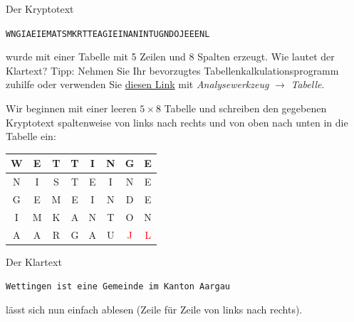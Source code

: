 \begin{myexercise}
	Der Kryptotext
	\begin{center}
		\texttt{WNGIAEIEMATSMKRTTEAGIEINANINTUGNDOJEEENL}
	\end{center}
	wurde mit einer Tabelle mit 5 Zeilen und 8 Spalten erzeugt. Wie lautet der Klartext? Tipp: Nehmen Sie Ihr bevorzugtes Tabellenkalkulationsprogramm zuhilfe oder verwenden Sie \href{https://cryptbreaker.marcwidmer.xyz/solve}{diesen Link} mit \emph{Analysewerkzeug} $\rightarrow$ \emph{Tabelle}.
	\begin{myanswer}

		Wir beginnen mit einer leeren $5\times 8$ Tabelle und schreiben den gegebenen Kryptotext spaltenweise von links nach rechts und von oben nach unten in die Tabelle ein:
		\begin{table}[H]
			\centering
			\begin{tabular}{*{8}{C|}} %
				W & E & T & T & I & N & G                  & E                  \\ \hline
				N & I & S & T & E & I & N                  & E                  \\ \hline
				G & E & M & E & I & N & D                  & E                  \\ \hline
				I & M & K & A & N & T & O                  & N                  \\ \hline
				A & A & R & G & A & U & \textcolor{Red}{J} & \textcolor{Red}{L}
			\end{tabular}
		\end{table}
		Der Klartext
		\begin{center}
			\texttt{Wettingen ist eine Gemeinde im Kanton Aargau}
		\end{center}
		lässt sich nun einfach ablesen (Zeile für Zeile von links nach rechts).
	\end{myanswer}
\end{myexercise}

